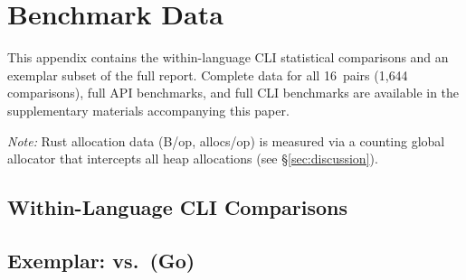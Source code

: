 \section{Benchmark Data}
\label{sec:appendix-tables}

This appendix contains the within-language CLI statistical comparisons
and an exemplar subset of the full report.
Complete data for all 16~pairs (1{,}644 comparisons), full API
benchmarks, and full CLI benchmarks are available in the supplementary
materials accompanying this paper.

\emph{Note:} Rust allocation data (B/op, allocs/op) is measured via a
counting global allocator that intercepts all heap allocations (see
\S\ref{sec:discussion}).

\subsection{Within-Language CLI Comparisons}



\begin{landscape}

\subsection{Exemplar: \schubfach vs.\ \burgerdybvig (Go)}


\end{landscape}
